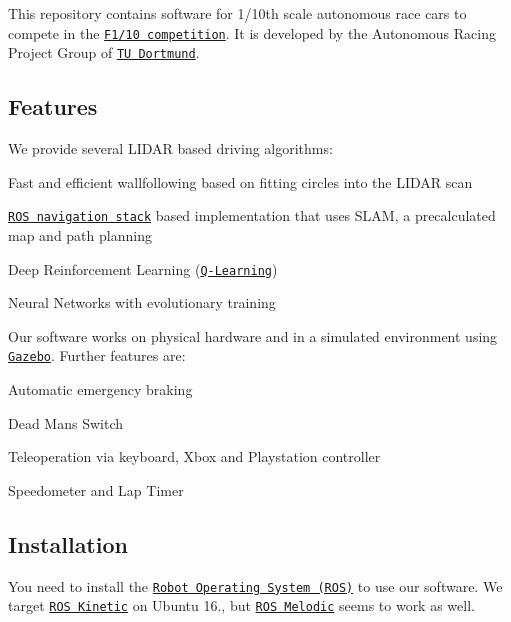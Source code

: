 \href{https://travis-ci.com/Autonomous-Racing-PG/ar-tu-do}{\tt }

This repository contains software for 1/10th scale autonomous race cars to compete in the \href{http://f1tenth.org/}{\tt F1/10 competition}. It is developed by the Autonomous Racing Project Group of \href{https://ls12-www.cs.tu-dortmund.de/daes/}{\tt TU Dortmund}.



\subsection*{Features}

We provide several L\+I\+D\+AR based driving algorithms\+:


\begin{DoxyItemize}
\item Fast and efficient wallfollowing based on fitting circles into the L\+I\+D\+AR scan
\item \href{http://wiki.ros.org/navigation}{\tt R\+OS navigation stack} based implementation that uses S\+L\+AM, a precalculated map and path planning
\item Deep Reinforcement Learning (\href{https://en.wikipedia.org/wiki/Q-learning}{\tt Q-\/\+Learning})
\item Neural Networks with evolutionary training
\end{DoxyItemize}

Our software works on physical hardware and in a simulated environment using \href{http://gazebosim.org/}{\tt Gazebo}. Further features are\+:


\begin{DoxyItemize}
\item Automatic emergency braking
\item Dead Man\textquotesingle{}s Switch
\item Teleoperation via keyboard, Xbox and Playstation controller
\item Speedometer and Lap Timer
\end{DoxyItemize}

\subsection*{Installation}

You need to install the \href{https://www.ros.org/}{\tt Robot Operating System (R\+OS)} to use our software. We target \href{http://wiki.ros.org/kinetic/Installation}{\tt R\+OS Kinetic} on Ubuntu 16., but \href{http://wiki.ros.org/melodic/Installation}{\tt R\+OS Melodic} seems to work as well.

